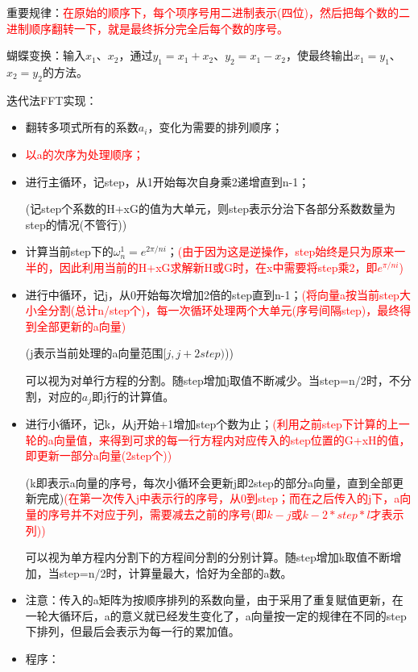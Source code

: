 \documentclass[UTF8]{article}%
\begin{document}
重要规律：\textcolor{red}{在原始的顺序下，每个项序号用二进制表示(四位)，然后把每个数的二进制顺序翻转一下，就是最终拆分完全后每个数的序号。}

蝴蝶变换：输入$x_1$、$x_2$，通过$y_1=x_1+x_2$、$y_2=x_1-x_2$，使最终输出$x_1=y_1$、$x_2=y_2$的方法。

迭代法FFT实现：

\begin{itemize}
    \item 翻转多项式所有的系数$a_i$，变化为需要的排列顺序；
    \item \textcolor{red}{以a的次序为处理顺序；}
    \item 进行主循环，记step，从1开始每次自身乘2递增直到n-1；
    
    (记step个系数的H+xG的值为大单元，则step表示分治下各部分系数数量为step的情况(不管行))
    
    \item 计算当前step下的$\omega_n^1=e^{{2\pi}/n i}$；\textcolor{red}{(由于因为这是逆操作，step始终是只为原来一半的，因此利用当前的H+xG求解新H或G时，在x中需要将step乘2，即$e^{\pi /n i}$)}
    \item 进行中循环，记j，从0开始每次增加2倍的step直到n-1；\textcolor{red}{(将向量a按当前step大小全分割(总计n/step个)，每一次循环处理两个大单元(序号间隔step)，最终得到全部更新的a向量)}
    
    (j表示当前处理的a向量范围$[j,j+2step)$))

    可以视为对单行方程的分割。随step增加j取值不断减少。当step=n/2时，不分割，对应的$a_j$即j行的计算值。

    \item 进行小循环，记k，从j开始+1增加step个数为止；\textcolor{red}{(利用之前step下计算的上一轮的a向量值，来得到可求的每一行方程内对应传入的step位置的G+xH的值，即更新一部分a向量(2step个))}
    
    (k即表示a向量的序号，每次小循环会更新j即2step的部分a向量，直到全部更新完成)\textcolor{red}{(在第一次传入j中表示行的序号，从0到step；而在之后传入的j下，a向量的序号并不对应于列，需要减去之前的序号(即$k-j$或$k-2*step*l$才表示列))}

    可以视为单方程内分割下的方程间分割的分别计算。随step增加k取值不断增加，当step=n/2时，计算量最大，恰好为全部的a数。

    \item 注意：传入的a矩阵为按顺序排列的系数向量，由于采用了重复赋值更新，在一轮大循环后，a的意义就已经发生变化了，a向量按一定的规律在不同的step下排列，但最后会表示为每一行的累加值。
    \item 程序：
    

\end{itemize}
\end{document}
